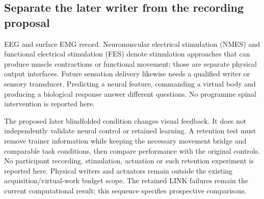 \subsection{Separate the later writer from the recording proposal}

EEG and surface EMG record. Neuromuscular electrical stimulation (NMES) and functional electrical stimulation (FES) denote stimulation approaches that can
produce muscle contractions or functional movement; those are separate physical
output interfaces. Future sensation delivery likewise needs a qualified writer
or sensory transducer. Predicting a neural feature, commanding a virtual body
and producing a biological response answer different questions. No programme spinal intervention is reported here.

The proposed later blindfolded condition changes visual feedback. It does not
independently validate neural control or retained learning. A retention test must
remove trainer information while keeping the necessary movement bridge and
comparable task conditions, then compare performance with the original controls.
No participant recording, stimulation, actuation or such retention experiment is
reported here. Physical writers and actuators remain outside the existing
acquisition/virtual-work budget scope. The retained LINK failures remain the
current computational result; this sequence specifies prospective comparisons.

